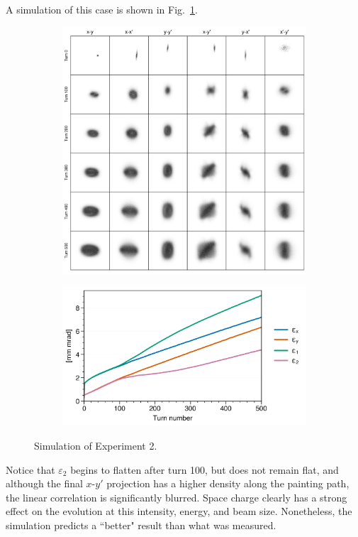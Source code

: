 A simulation of this case is shown in Fig.~\ref{fig:exp2_sim}.
%
\begin{figure}[!p]
    \centering
    \begin{subfigure}{0.85\textwidth}
        \includegraphics[width=\textwidth]{Images/chapter5/exp2/sim_snapshots.png}
    \end{subfigure}
    \vfill
    \vspace*{1.0cm}
    \vfill
    \begin{subfigure}{0.7\textwidth}
        \includegraphics[width=\textwidth]{Images/chapter5/exp2/sim_emittances.png}
    \end{subfigure}
    \caption{Simulation of Experiment 2.}
    \label{fig:exp2_sim}
\end{figure}
%
Notice that $\varepsilon_2$ begins to flatten after turn 100, but does not remain flat, and although the final $x$-$y'$ projection has a higher density along the painting path, the linear correlation is significantly blurred. Space charge clearly has a strong effect on the evolution at this intensity, energy, and beam size. Nonetheless, the simulation predicts a ``better" result than what was measured.



